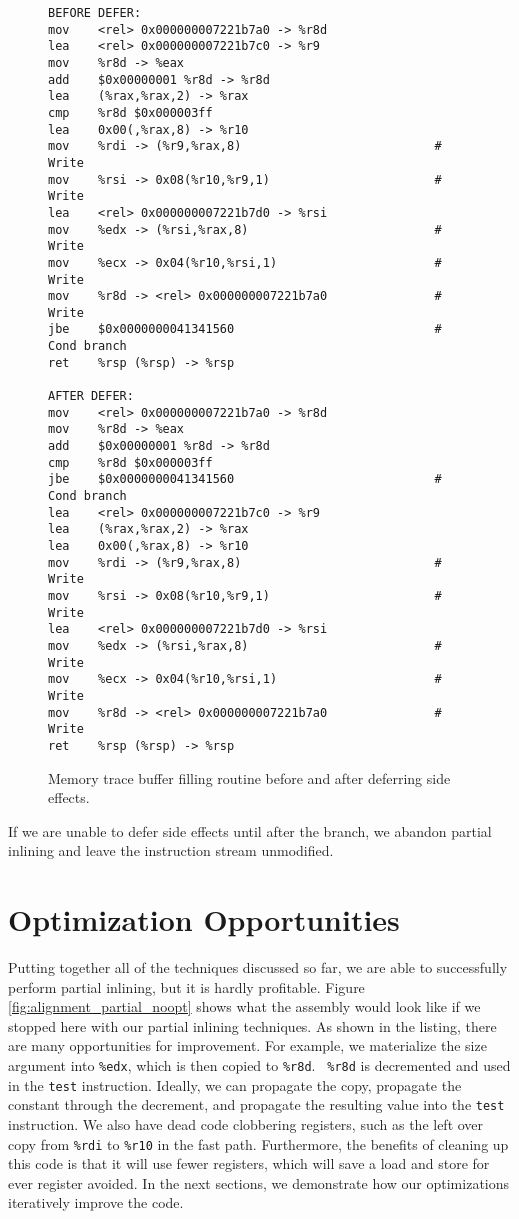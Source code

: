 \begin{figure}
\begin{verbatim}
BEFORE DEFER:
mov    <rel> 0x000000007221b7a0 -> %r8d
lea    <rel> 0x000000007221b7c0 -> %r9
mov    %r8d -> %eax
add    $0x00000001 %r8d -> %r8d
lea    (%rax,%rax,2) -> %rax
cmp    %r8d $0x000003ff
lea    0x00(,%rax,8) -> %r10
mov    %rdi -> (%r9,%rax,8)                           # Write
mov    %rsi -> 0x08(%r10,%r9,1)                       # Write
lea    <rel> 0x000000007221b7d0 -> %rsi
mov    %edx -> (%rsi,%rax,8)                          # Write
mov    %ecx -> 0x04(%r10,%rsi,1)                      # Write
mov    %r8d -> <rel> 0x000000007221b7a0               # Write
jbe    $0x0000000041341560                            # Cond branch
ret    %rsp (%rsp) -> %rsp

AFTER DEFER:
mov    <rel> 0x000000007221b7a0 -> %r8d
mov    %r8d -> %eax
add    $0x00000001 %r8d -> %r8d
cmp    %r8d $0x000003ff
jbe    $0x0000000041341560                            # Cond branch
lea    <rel> 0x000000007221b7c0 -> %r9
lea    (%rax,%rax,2) -> %rax
lea    0x00(,%rax,8) -> %r10
mov    %rdi -> (%r9,%rax,8)                           # Write
mov    %rsi -> 0x08(%r10,%r9,1)                       # Write
lea    <rel> 0x000000007221b7d0 -> %rsi
mov    %edx -> (%rsi,%rax,8)                          # Write
mov    %ecx -> 0x04(%r10,%rsi,1)                      # Write
mov    %r8d -> <rel> 0x000000007221b7a0               # Write
ret    %rsp (%rsp) -> %rsp
\end{verbatim}
\caption{Memory trace buffer filling routine before and after deferring side
effects.}
\label{fig:memtrace_defer}
\end{figure}

If we are unable to defer side effects until after the branch, we abandon
partial inlining and leave the instruction stream unmodified.

\section{Optimization Opportunities}

Putting together all of the techniques discussed so far, we are able to
successfully perform partial inlining, but it is hardly profitable.  Figure
\ref{fig:alignment_partial_noopt} shows what the assembly would look like if we
stopped here with our partial inlining techniques.  As shown in the listing,
there are many opportunities for improvement.  For example, we materialize the
size argument into {\tt \%edx}, which is then copied to {\tt \%r8d}.  {\tt
\%r8d} is decremented and used in the {\tt test} instruction.  Ideally, we can
propagate the copy, propagate the constant through the decrement, and propagate
the resulting value into the {\tt test} instruction.  We also have dead code
clobbering registers, such as the left over copy from {\tt \%rdi} to {\tt \%r10}
in the fast path.  Furthermore, the benefits of cleaning up this code is that it
will use fewer registers, which will save a load and store for ever register
avoided.  In the next sections, we demonstrate how our optimizations iteratively
improve the code.

